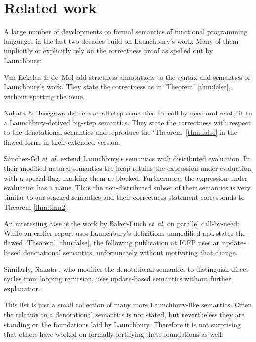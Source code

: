 \documentclass{scrartcl}
\theoremstyle{nonumberbreak}
\newcommand{\shortcite}{\cite}
\begin{document}
\section{Related work}

A large number of developments on formal semantics of functional programming languages in the last two decades build on Launchbury’s work. Many of them implicitly or explicitly rely on the correctness proof as spelled out by Launchbury:

Van Eekelen \& de~Mol \shortcite{mixed} add strictness annotations to the syntax and semantics of Launchbury’s work. They state the correctness as in `Theorem' \ref{thm:false}, without spotting the issue.


Nakata \& Hasegawa \shortcite{nakata} define a small-step semantics for call-by-need and relate it to a Launchbury-derived big-step semantics. They state the correctness with respect to the denotational semantics and reproduce the `Theorem' \ref{thm:false} in the flawed form, in their extended version.

S{\'a}nchez-Gil {\em et~al.} \shortcite{distributed} extend Launchbury's semantics with distributed evaluation.  In their modified natural semantics the heap retains the expression under evaluation with a special flag, marking them as blocked. Furthermore, the expression under evaluation has a name. Thus the non-distributed subset of their semantics is very similar to our stacked semantics and their correctness statement corresponds to Theorem \ref{thm:thm2}.

An interesting case is the work by Baker-Finch {\em et~al.} on parallel call-by-need: While an earlier report \shortcite{parallel-tr} uses Launchbury’s definitions unmodified and states the flawed `Theorem' \ref{thm:false}, the following publication at ICFP \shortcite{parallel} uses an update-based denotational semantics, unfortunately without motivating that change.

Similarly, Nakata  \shortcite{nakata_blackhole}, who modifies the denotational semantics to distinguish direct cycles from looping recursion, uses update-based semantics without further explanation. 

This list is just a small collection of many more Launchbury-like semantics. Often the relation to a denotational semantics is not stated, but nevertheless they are standing on the foundations laid by Launchbury. Therefore it is not surprising that others have worked on formally fortifying these foundations as well:
\end{document}
